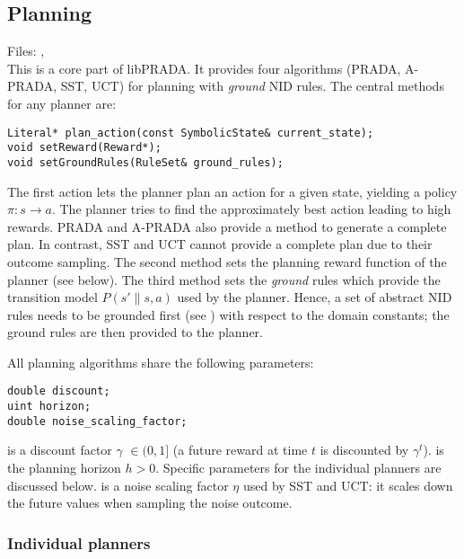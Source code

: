 \documentclass[10pt,twoside,twocolumn,fleqn]{article}
\begin{document}

\subsection{Planning}

Files: , \\

This is a core part of libPRADA. It provides four algorithms (PRADA,
A-PRADA, SST, UCT) for planning with \emph{ground} NID rules. The central
methods for any planner are:
\begin{lstlisting}
Literal* plan_action(const SymbolicState& current_state);
void setReward(Reward*);
void setGroundRules(RuleSet& ground_rules);
\end{lstlisting}
The first action lets the planner plan an action for a given state,
yielding a policy $\pi: s \to a$. The planner tries to find the
approximately best action leading to high rewards. PRADA and A-PRADA also
provide a method to generate a complete plan. In contrast, SST and UCT
cannot provide a complete plan due to their outcome sampling. The second
method sets the planning reward function of the planner (see below). The
third method sets the \emph{ground} rules which provide the transition
model $P(s'\|s,a)$ used by the planner. Hence, a set of abstract NID rules
needs to be grounded first (see ) with respect to
the domain constants; the ground rules are then provided to the planner.

All planning algorithms share the following parameters:
\begin{lstlisting}
double discount;
uint horizon;
double noise_scaling_factor;
\end{lstlisting}
 is a discount factor $\gamma$ $\in (0,1]$ (a future reward
at time $t$ is discounted by $\gamma^t$).  is the planning
horizon $h>0$. Specific parameters for the individual planners are
discussed below.  is a noise scaling factor
$\eta$ used by SST and UCT: it scales down the future values when sampling
the noise outcome.


\subsubsection{Individual planners}
\end{document}

